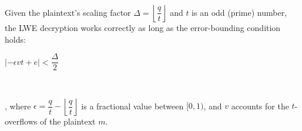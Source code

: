 \begin{tcolorbox}[title={\textbf{\tboxlabel{\ref*{subsubsec:lwe-noise-bound}} Noise Budget for an Odd Plaintext Modulus $\bm{t}$}}]


Given the plaintext's scaling factor $\Delta=\left\lfloor\dfrac{q}{t}\right\rfloor$ and $t$ is an odd (prime) number, the LWE decryption works correctly as long as the error-bounding condition holds: 

$|-\epsilon vt + e| < \dfrac{\Delta}{2}$

$ $

, where $\epsilon = \dfrac{q}{t} - \left\lfloor\dfrac{q}{t}\right\rfloor$ is a fractional value between $[0, 1)$, and $v$ accounts for the $t$-overflows of the plaintext $m$.

\end{tcolorbox}

